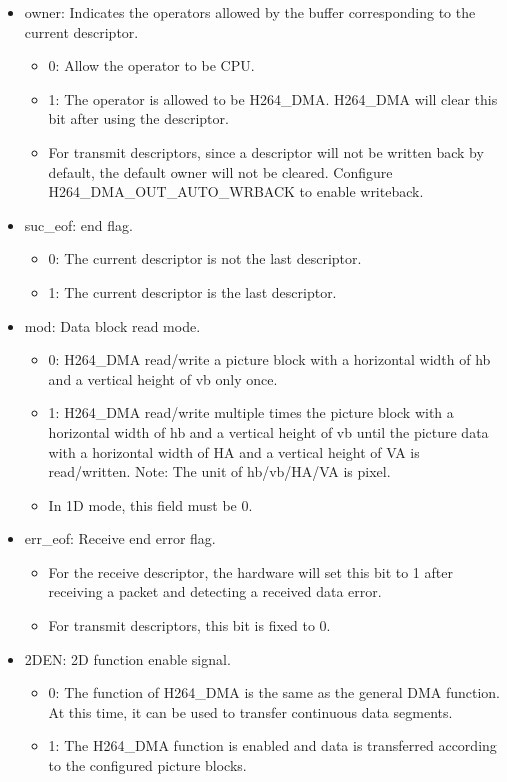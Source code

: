 \documentclass[main\_\_EN.tex]{subfiles}
\begin{document}
\begin{itemize}
\item owner: Indicates the operators allowed by the buffer corresponding to the current descriptor.
    \begin{itemize}
    \item 0: Allow the operator to be CPU.
    \item 1: The operator is allowed to be H264\_DMA. H264\_DMA will clear this bit after using the descriptor.
    \item For transmit descriptors, since a descriptor will not be written back by default, the default owner will not be cleared. Configure H264\_DMA\_OUT\_AUTO\_WRBACK to enable writeback.
    \end{itemize}

\item suc\_eof: end flag.
    \begin{itemize}
    \item 0: The current descriptor is not the last descriptor.
    \item 1: The current descriptor is the last descriptor.
    \end{itemize}
\item mod: Data block read mode.
    \begin{itemize}
    \item 0: H264\_DMA read/write a picture block with a horizontal width of hb and a vertical height of vb only once.
    \item 1: H264\_DMA read/write multiple times the picture block with a horizontal width of hb and a vertical height of vb until the picture data with a horizontal width of HA and a vertical height of VA is read/written. Note: The unit of hb/vb/HA/VA is pixel.
    \item In 1D mode, this field must be 0.
    \end{itemize}

\item err\_eof: Receive end error flag.
    \begin{itemize}
    \item For the receive descriptor, the hardware will set this bit to 1 after receiving a packet and detecting a received data error.
    \item For transmit descriptors, this bit is fixed to 0.
    \end{itemize}

\item 2DEN: 2D function enable signal.
    \begin{itemize}
    \item 0: The function of H264\_DMA is the same as the general DMA function. At this time, it can be used to transfer continuous data segments.
    \item 1: The H264\_DMA function is enabled and data is transferred according to the configured picture blocks.
    \end{itemize}


\end{itemize}
\end{document}
